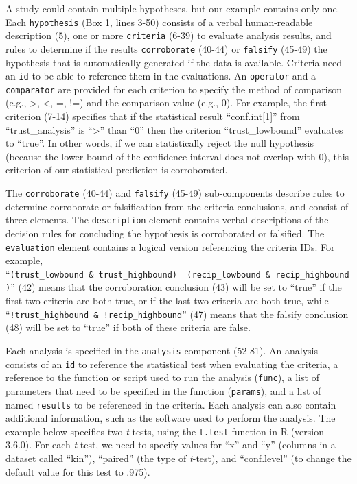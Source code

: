 \documentclass[english,doc,floatsintext]{apa6}
\begin{document}
A study could contain multiple hypotheses, but our example contains only one. Each \texttt{hypothesis} (Box 1, lines 3-50) consists of a verbal human-readable description (5), one or more \texttt{criteria} (6-39) to evaluate analysis results, and rules to determine if the results \texttt{corroborate} (40-44) or \texttt{falsify} (45-49) the hypothesis that is automatically generated if the data is available. Criteria need an \texttt{id} to be able to reference them in the evaluations. An \texttt{operator} and a \texttt{comparator} are provided for each criterion to specify the method of comparison (e.g., \textgreater{}, \textless{}, =, !=) and the comparison value (e.g., 0). For example, the first criterion (7-14) specifies that if the statistical result \enquote{conf.int{[}1{]}} from \enquote{trust\_analysis} is \enquote{\textgreater{}} than \enquote{0} then the criterion \enquote{trust\_lowbound} evaluates to \enquote{true}. In other words, if we can statistically reject the null hypothesis (because the lower bound of the confidence interval does not overlap with 0), this criterion of our statistical prediction is corroborated.

The \texttt{corroborate} (40-44) and \texttt{falsify} (45-49) sub-components describe rules to determine corroborate or falsification from the criteria conclusions, and consist of three elements. The \texttt{description} element contains verbal descriptions of the decision rules for concluding the hypothesis is corroborated or falsified. The \texttt{evaluation} element contains a logical version referencing the criteria IDs. For example, \enquote{\texttt{(trust\_lowbound\ \&\ trust\_highbound)\ \textbar{}\ (recip\_lowbound\ \&\ recip\_highbound)}} (42) means that the corroboration conclusion (43) will be set to \enquote{true} if the first two criteria are both true, or if the last two criteria are both true, while \enquote{\texttt{!trust\_highbound\ \&\ !recip\_highbound}} (47) means that the falsify conclusion (48) will be set to \enquote{true} if both of these criteria are false.

Each analysis is specified in the \texttt{analysis} component (52-81). An analysis consists of an \texttt{id} to reference the statistical test when evaluating the criteria, a reference to the function or script used to run the analysis (\texttt{func}), a list of parameters that need to be specified in the function (\texttt{params}), and a list of named \texttt{results} to be referenced in the criteria. Each analysis can also contain additional information, such as the software used to perform the analysis. The example below specifies two \emph{t}-tests, using the \texttt{t.test} function in R (version 3.6.0). For each \emph{t}-test, we need to specify values for \enquote{x} and \enquote{y} (columns in a dataset called \enquote{kin}), \enquote{paired} (the type of \emph{t}-test), and \enquote{conf.level} (to change the default value for this test to .975).
\end{document}
